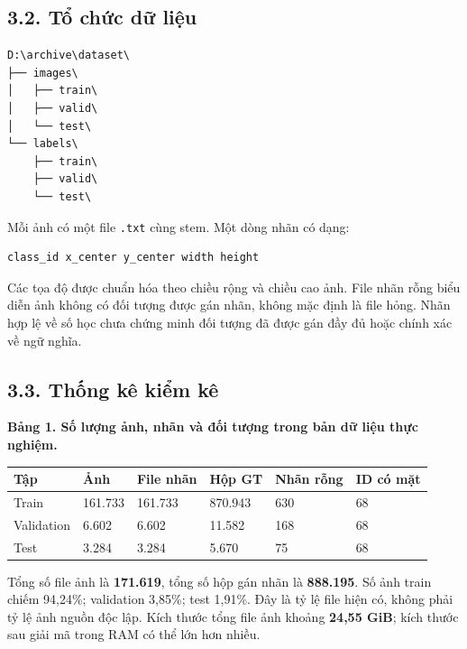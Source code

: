\documentclass[
  vietnamese,
  12pt,
  a4paper,
]{article}
\newcounter{none} %
\begin{document}
\subsection{3.2. Tổ chức dữ
liệu}\label{tux1ed5-chux1ee9c-dux1eef-liux1ec7u}

\begin{Verbatim}[breaklines=true,breakanywhere=true,fontsize=\footnotesize,baselinestretch=1]
D:\archive\dataset\
├── images\
│   ├── train\
│   ├── valid\
│   └── test\
└── labels\
    ├── train\
    ├── valid\
    └── test\
\end{Verbatim}

Mỗi ảnh có một file
\texttt{.\allowbreak{}t\allowbreak{}x\allowbreak{}t\allowbreak{}} cùng
stem. Một dòng nhãn có dạng:

\begin{Verbatim}[breaklines=true,breakanywhere=true,fontsize=\footnotesize,baselinestretch=1]
class_id x_center y_center width height
\end{Verbatim}

Các tọa độ được chuẩn hóa theo chiều rộng và chiều cao ảnh. File nhãn
rỗng biểu diễn ảnh không có đối tượng được gán nhãn, không mặc định là
file hỏng. Nhãn hợp lệ về số học chưa chứng minh đối tượng đã được gán
đầy đủ hoặc chính xác về ngữ nghĩa.

\subsection{3.3. Thống kê kiểm
kê}\label{thux1ed1ng-kuxea-kiux1ec3m-kuxea}

\textbf{Bảng 1. Số lượng ảnh, nhãn và đối tượng trong bản dữ liệu thực
nghiệm.}

\begingroup\small\setlength{\tabcolsep}{4pt}\renewcommand{\arraystretch}{1.12}

{\def\LTcaptype{none} %
\begin{longtable}[]{@{}llllll@{}}
\toprule\noalign{}
Tập & Ảnh & File nhãn & Hộp GT & Nhãn rỗng & ID có mặt \\
\midrule\noalign{}
\endhead
\bottomrule\noalign{}
\endlastfoot
Train & 161.733 & 161.733 & 870.943 & 630 & 68 \\
Validation & 6.602 & 6.602 & 11.582 & 168 & 68 \\
Test & 3.284 & 3.284 & 5.670 & 75 & 68 \\
\end{longtable}
}

\endgroup

Tổng số file ảnh là \textbf{171.619}, tổng số hộp gán nhãn là
\textbf{888.195}. Số ảnh train chiếm 94,24\%; validation 3,85\%; test
1,91\%. Đây là tỷ lệ file hiện có, không phải tỷ lệ ảnh nguồn độc lập.
Kích thước tổng file ảnh khoảng \textbf{24,55 GiB}; kích thước sau giải
mã trong RAM có thể lớn hơn nhiều.
\end{document}
